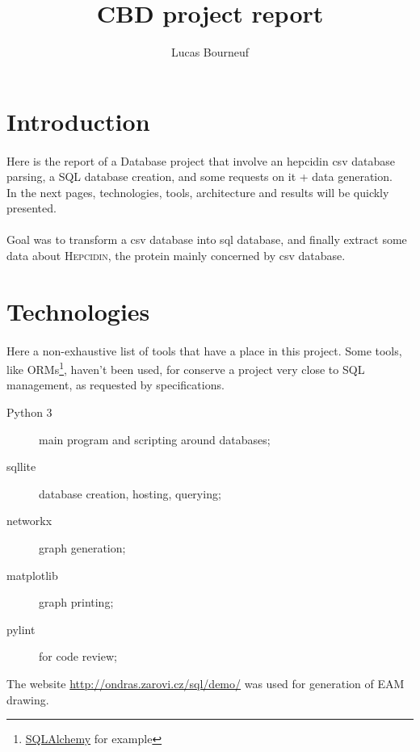 \documentclass{report} %
\title{CBD project report}
\author{Lucas Bourneuf}
\date{}
\begin{document}
        \renewcommand*\thesection{\arabic{section}} %
        \maketitle %




\section*{Introduction}
    \paragraph*{}
    Here is the report of a Database project that involve an hepcidin csv database parsing, a SQL database creation, and some requests on it + data generation.\\
    In the next pages, technologies, tools, architecture and results will be quickly presented.
    \paragraph*{}
    Goal was to transform a csv database into sql database, and finally extract some data about \textsc{Hepcidin}, the protein mainly concerned by csv database.


\section{Technologies}
    \paragraph*{}
    Here a non-exhaustive list of tools that have a place in this project.
    Some tools, like ORMs\footnote{\href{http://www.sqlalchemy.org/}{SQLAlchemy} for example}, haven't been used,
    for conserve a project very close to SQL management, as requested by specifications.
    \begin{description}
            \item[Python 3] main program and scripting around databases;
            \item[sqllite] database creation, hosting, querying;
            \item[networkx] graph generation;
            \item[matplotlib] graph printing;
            \item[pylint] for code review;
    \end{description}
    The website \url{http://ondras.zarovi.cz/sql/demo/} was used for generation of EAM drawing.
\end{document}
